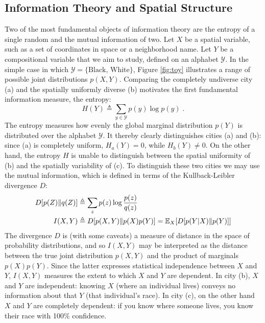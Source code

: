 	
\subsection{Information Theory and Spatial Structure}
	Two of the most fundamental objects of information theory are the entropy of a single random and the mutual information of two. Let $X$ be a spatial variable, such as a set of coordinates in space or a neighborhood name. Let $Y$ be a compositional variable that we aim to study, defined on an alphabet $\mathcal{Y}$. In the simple case in which $\mathcal{Y}  = \{\text{Black, White}\}$, Figure \ref{fig:toy} illustrates a range of possible joint distributions $p(X,Y)$. Comparing the completely undiverse city (a) and the spatially uniformly diverse (b) motivates the first fundamental information measure, the entropy:
	\begin{equation}
		H(Y) \triangleq \sum_{y \in \mathcal{Y}} p(y) \log p(y)\;.
	\end{equation}
	The entropy measures how evenly the global marginal distribution $p(Y)$ is distributed over the alphabet $\mathcal{Y}$. It thereby clearly distinguishes cities (a) and (b): since (a) is completely uniform, $H_a(Y) = 0$, while $H_b(Y) \neq 0$. On the other hand, the entropy $H$ is unable to distinguish between the spatial uniformity of (b) and the spatially variability of (c). To distinguish these two cities we may use the mutual information, which is defined in terms of the Kullback-Leibler divergence $D$:
	\begin{align}
		D[p(Z)\|q(Z)] &\triangleq \sum_z p(z) \log \frac{p(z)}{q(z)} \\
		I(X,Y) &\triangleq D[p(X,Y) \| p(X)p(Y)] = \mathbb{E}_X[D[p(Y|X)\|p(Y)]]
	\end{align}
	The divergence $D$ is (with some caveats) a measure of distance in the space of probability distributions, and so $I(X,Y)$ may be interpreted as the distance between the true joint distribution $p(X,Y)$ and the product of marginals $p(X)p(Y)$. Since the latter expresses statistical independence between $X$ and $Y$, $I(X,Y)$ measures the extent to which $X$ and $Y$ are dependent. In city (b), $X$ and $Y$ are independent: knowing $X$ (where an individual lives) conveys no information about that $Y$ (that individual's race).  In city (c), on the other hand $X$ and $Y$ are completely dependent: if you know where someone lives, you know their race with 100\% confidence. 

